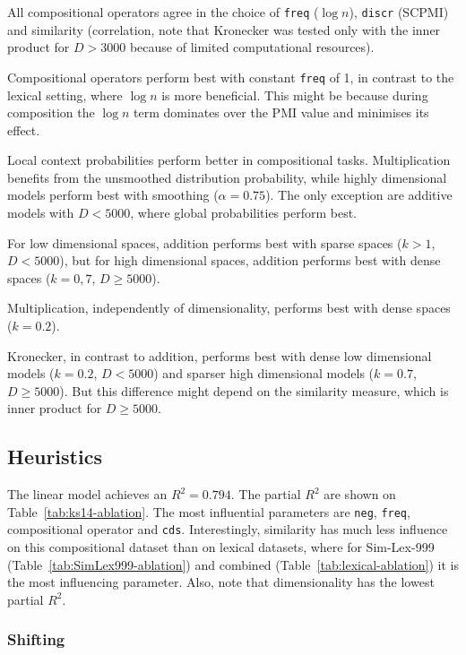 All compositional operators agree in the choice of \texttt{freq} ($\log n$), \texttt{discr} (SCPMI) and similarity (correlation, note that Kronecker was tested only with the inner product for $D > 3000$ because of limited computational resources).

Compositional operators perform best with constant \texttt{freq} of 1, in contrast to the lexical setting, where $\log n$ is more beneficial. This might be because during composition the $\log n$ term dominates over the PMI value and minimises its effect.

Local context probabilities perform better in compositional tasks. Multiplication benefits from the unsmoothed distribution probability, while highly dimensional models perform best with smoothing ($\alpha = 0.75$). The only exception are additive models with $D < 5000$, where global probabilities perform best.

For low dimensional spaces, addition performs best with sparse spaces ($k > 1$, $D < 5000$), but for high dimensional spaces, addition performs best  with dense spaces ($k = 0,7$, $D \geq 5000$).

Multiplication, independently of dimensionality, performs best with dense spaces ($k = 0.2$).

Kronecker, in contrast to addition, performs best with dense low dimensional models ($k = 0.2$, $D < 5000$) and sparser high dimensional models ($k = 0.7$, $D \geq 5000$). But this difference might depend on the similarity measure, which is inner product for $D \geq 5000$.

\subsection{Heuristics}
\label{sec:heuristics}



The linear model achieves an $R^2 = 0.794$. The partial $R^2$ are shown on Table~\ref{tab:ks14-ablation}. The most influential parameters are \texttt{neg}, \texttt{freq}, compositional operator and \texttt{cds}. Interestingly, similarity has much less influence on this compositional dataset than on lexical datasets, where for Sim-Lex-999 (Table~\ref{tab:SimLex999-ablation}) and combined (Table~\ref{tab:lexical-ablation}) it is the most influencing parameter. Also, note that dimensionality has the lowest partial $R^2$.

\subsubsection{Shifting}


